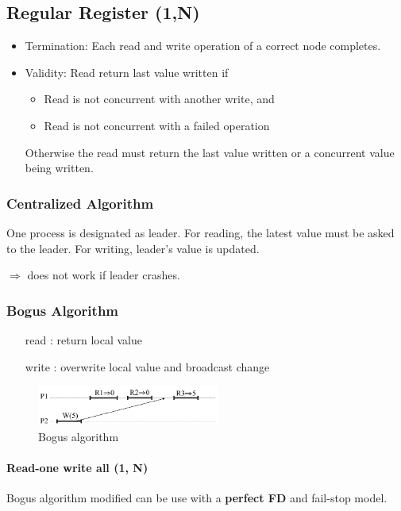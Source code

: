 \subsection{Regular Register (1,N)}
\begin{itemize}
	\item Termination: Each read and write operation of a correct node
	completes.
	\item Validity: Read return last value written if
		\begin{itemize}
			\item Read is not concurrent with another write, and
			\item Read is not concurrent with a failed operation
		\end{itemize}
	Otherwise the read must return the last value
	written or a concurrent value being written.
\end{itemize}


\subsubsection{Centralized Algorithm}

One process is designated as leader. For reading, the latest value must
be asked to the leader. For writing, leader's value is updated.

$\Rightarrow$ does not work if leader crashes.

\subsubsection{Bogus Algorithm}
\begin{itemize}
    \item[read]: return local value
    \item[write]: overwrite local value and broadcast change
\end{itemize}

\begin{figure}[!ht]
    \centering
        \includegraphics[width=6cm]{img/bogus_1.png}
        \caption{Bogus algorithm}
\end{figure}
\FloatBarrier{}

\paragraph{Read-one write all (1, N)}
Bogus algorithm modified can be use with a \textbf{perfect FD}
and fail-stop model.

